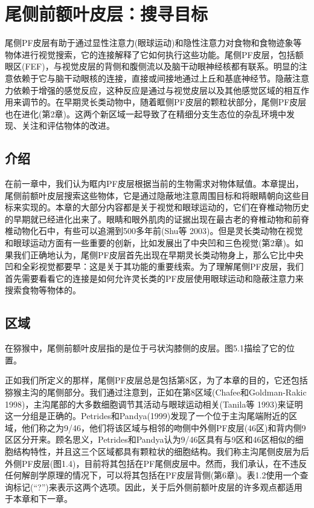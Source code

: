 \chapter{尾侧前额叶皮层：搜寻目标}
尾侧PF皮层有助于通过显性注意力(眼球运动)和隐性注意力对食物和食物迹象等物体进行视觉搜索，它的连接解释了它如何执行这些功能。尾侧PF皮层，包括额眼区(FEF)，与视觉皮层的背侧和腹侧流以及脑干动眼神经核都有联系。明显的注意依赖于它与脑干动眼核的连接，直接或间接地通过上丘和基底神经节。隐蔽注意力依赖于增强的感觉反应，这种反应是通过与视觉皮层以及其他感觉区域的相互作用来调节的。在早期灵长类动物中，随着眶侧PF皮层的颗粒状部分，尾侧PF皮层也在进化(第2章)。这两个新区域一起导致了在精细分支生态位的杂乱环境中发现、关注和评估物体的改进。

\section{介绍}
在前一章中，我们认为眶内PF皮层根据当前的生物需求对物体赋值。本章提出，尾侧前额叶皮层搜索这些物体，它是通过隐蔽地注意周围目标和将眼睛朝向这些目标来实现的。本章的大部分内容都是关于视觉和眼球运动的，它们在脊椎动物历史的早期就已经进化出来了。眼睛和眼外肌肉的证据出现在最古老的脊椎动物和前脊椎动物化石中，有些可以追溯到500多年前(Shu等 2003)。但是灵长类动物在视觉和眼球运动方面有一些重要的创新，比如发展出了中央凹和三色视觉(第2章)。如果我们正确地认为，尾侧PF皮层首先出现在早期灵长类动物身上，那么它比中央凹和全彩视觉都要早：这是关于其功能的重要线索。为了理解尾侧PF皮层，我们首先需要看看它的连接是如何允许灵长类的PF皮层使用眼球运动和隐蔽注意力来搜索食物等物体的。
\section{区域}
在猕猴中，尾侧前额叶皮层指的是位于弓状沟膝侧的皮层。图5.1描绘了它的位置。

正如我们所定义的那样，尾侧PF皮层总是包括第8区，为了本章的目的，它还包括猕猴主沟的尾侧部分。我们通过注意到，正如在第8区域(Chafee和Goldman-Rakic 1998)，主沟尾部的大多数细胞调节其活动与眼球运动相关(Tanila等 1993)来证明这一分组是正确的。Petrides和Pandya(1999)发现了一个位于主沟尾端附近的区域，他们称之为9/46，他们将该区域与相邻的吻侧中外侧PF皮层(46区)和背内侧9区区分开来。顾名思义，Petrides和Pandya认为9/46区具有与9区和46区相似的细胞结构特性，并且这三个区域都具有颗粒状的细胞结构。我们称主沟尾侧皮层为后外侧PF皮层(图1.4)，目前将其包括在PF尾侧皮层中。然而，我们承认，在不违反任何解剖学原理的情况下，可以将其包括在PF皮层背侧(第6章)。表1.2使用一个查询标记(“?”)来表示这两个选项。因此，关于后外侧前额叶皮层的许多观点都适用于本章和下一章。

